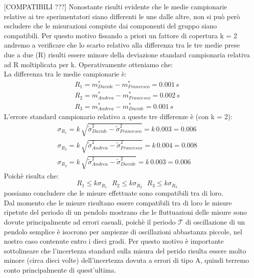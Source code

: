 [COMPATIBILI ???]
Nonostante risulti evidente che le medie campionarie relative ai tre sperimentatori siano differenti le une dalle altre, non si può però escludere che le misurazioni compiute dai componenti del gruppo siano compatibili. Per questo motivo fissando a priori un fattore di copertura k = 2 andremo a verificare che lo scarto relativo alla differenza tra le tre medie prese due a due (R) risulti essere minore della deviazione standard campionaria relativa ad R moltiplicata per k. Operativamente otteniamo che:\\
La differenza tra le medie campionarie è:
\begin{equation}
\begin{split}
	R_{1} = m_{Davide}^* - m_{Francesco}^* = 0.001\,s \\
	R_{2} = m_{Andrea}^* - m_{Francesco}^* = 0.002\,s \\
	R_{3} = m_{Andrea}^* - m_{Davide}^* = 0.001\,s
\end{split}
\end{equation}
L'errore standard campionario relativo a queste tre differenze è (con k = 2):
\begin{equation}
\begin{split}
	\sigma_{R_{1}} = k\,\sqrt{\tilde{\sigma}^2_{Davide} - \tilde{\sigma}^2_{Francesco}} = k\,0.003 = 0.006\\
	\sigma_{R_{2}} = k\,\sqrt{\tilde{\sigma}^2_{Andrea} - \tilde{\sigma}^2_{Francesco}} = k\,0.004 = 0.008\\
	\sigma_{R_{3}} = k\,\sqrt{\tilde{\sigma}^2_{Andrea} - \tilde{\sigma}^2_{Davide}} = k\,0.003 = 0.006
\end{split}
\end{equation}
Poichè risulta che:
\begin{equation}
	R_{1}\leq{k\sigma_{R_{1}}}\,\,\,\,R_{2}\leq{k\sigma_{R_{2}}}\,\,\,\,R_{3}\leq{k\sigma_{R_{3}}}
\end{equation}
possiamo concludere che le misure effettuate sono compatibili tra di loro.\\
 
Dal momento che le misure risultano essere compatibili tra di loro le misure ripetute del periodo di un pendolo mostrano che le fluttuazioni delle misure sono dovute principalmente ad errori casuali, poichè il periodo
$\mathcal{T}$ di oscillazione di un pendolo semplice è isocrono per ampiezze
di oscillazioni abbastanza piccole, nel nostro caso contenute entro i dieci gradi.
Per questo motivo è importante sottolineare che l'incertezza standard sulla
misura del perido risulta essere molto minore (circa dieci volte) dell'incertezza
dovuta a errori di tipo A, quindi terremo conto principalmente di quest'ultima.


